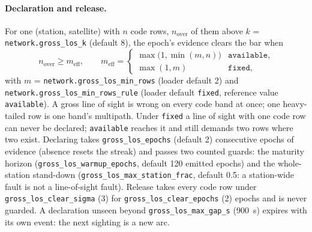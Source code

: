 \documentclass[main.tex]{subfiles}
\begin{document}
\paragraph{Declaration and release.}
For one (station, satellite) with $n$ code rows, $n_{\mathrm{over}}$ of
them above $k$ = \texttt{network.gross\_los\_k} (default 8), the epoch's
evidence clears the bar when
\begin{equation}
n_{\mathrm{over}} \ge m_{\mathrm{eff}}, \qquad
m_{\mathrm{eff}} =
\begin{cases}
\max\big(1, \min(m, n)\big) & \texttt{available},\\
\max(1, m) & \texttt{fixed},
\end{cases}
\label{eq:wire-gl-bar}
\end{equation}
with $m$ = \texttt{network.gross\_los\_min\_rows} (loader default 2) and
\texttt{network.gross\_los\_min\_rows\_rule} (loader default
\texttt{fixed}, reference value \texttt{available}). A gross line of sight
is wrong on every code band at once; one heavy-tailed row is one band's
multipath. Under \texttt{fixed} a line of sight with one code row can never
be declared; \texttt{available} reaches it and still demands two rows where
two exist. Declaring takes \texttt{gross\_los\_epochs} (default 2)
consecutive epochs of evidence (absence resets the streak) and passes two
counted guards: the maturity horizon
(\texttt{gross\_los\_warmup\_epochs}, default 120 emitted epochs) and the
whole-station stand-down (\texttt{gross\_los\_max\_station\_frac}, default
0.5: a station-wide fault is not a line-of-sight fault). Release takes every
code row under \texttt{gross\_los\_clear\_sigma} (3) for
\texttt{gross\_los\_clear\_epochs} (2) epochs and is never guarded. A
declaration unseen beyond \texttt{gross\_los\_max\_gap\_s} (900~s) expires
with its own event: the next sighting is a new arc.
\end{document}
